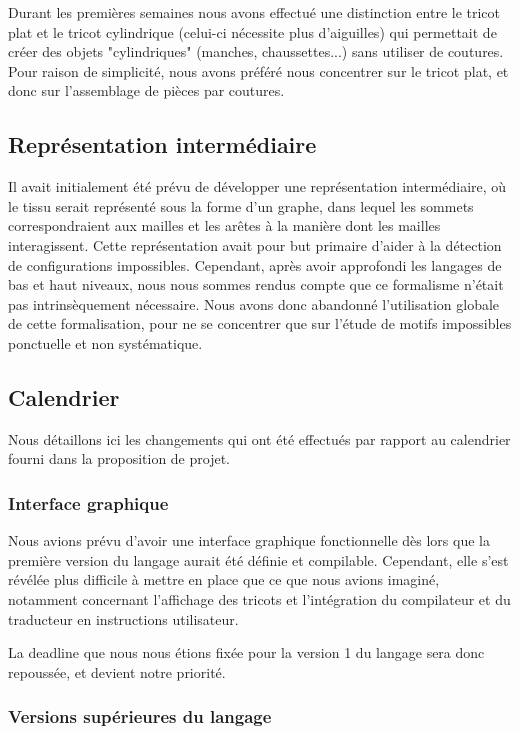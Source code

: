 \documentclass{article}
\begin{document}
Durant les premières semaines nous avons effectué une distinction entre le tricot plat et le tricot cylindrique (celui-ci nécessite plus d'aiguilles) qui permettait de créer des objets "cylindriques" (manches, chaussettes...) sans utiliser de coutures. Pour raison de simplicité, nous avons préféré nous concentrer sur le tricot plat, et donc sur l'assemblage de pièces par coutures.

\subsection{Représentation intermédiaire} 

Il avait initialement été prévu de développer une représentation intermédiaire, où le tissu serait représenté sous la forme d'un graphe,
dans lequel les sommets correspondraient aux mailles et les arêtes à la manière dont les mailles interagissent. Cette représentation avait
pour but primaire d'aider à la détection de configurations impossibles. Cependant, après avoir approfondi les langages de bas et haut
niveaux, nous nous sommes rendus compte que ce formalisme n'était pas intrinsèquement nécessaire. %
Nous avons donc abandonné l'utilisation globale de cette formalisation, pour ne se concentrer que sur l'étude de motifs impossibles
ponctuelle et non systématique.

\subsection{Calendrier}

Nous détaillons ici les changements qui ont été effectués par rapport au calendrier fourni dans la proposition de projet.

\subsubsection{Interface graphique}

Nous avions prévu d'avoir une interface graphique fonctionnelle dès lors que la première version du langage aurait été définie et compilable.  
Cependant, elle s'est révélée plus difficile à mettre en place que ce que nous avions imaginé, notamment concernant l'affichage des tricots et l'intégration du compilateur et du traducteur en instructions utilisateur.

La deadline que nous nous étions fixée pour la version 1 du langage sera donc repoussée, et devient notre priorité.

\subsubsection{Versions supérieures du langage}
\end{document}
